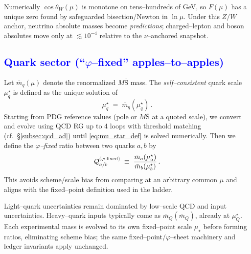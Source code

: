 \documentclass[%
 amsmath,amssymb,
 aps,
prb,
floatfix, showkeys
]{revtex4-2}
\newcommand{\modif}[1]{\textcolor{blue}{#1}}
\begin{document}
Numerically $\cos\theta_W(\mu)$ is monotone on tens–hundreds of GeV, so $F(\mu)$ has a unique zero found by safeguarded bisection/Newton in $\ln\mu$. Under this $Z/W$ anchor, neutrino absolute masses become \emph{predictions}; charged--lepton and boson absolutes move only at $\lesssim10^{-4}$ relative to the $\nu$--anchored snapshot.
















{\modif{
    \subsection{Quark sector (``$\varphi$--fixed'' apples--to--apples)}
}}
Let $\bar m_q(\mu)$ denote the renormalized $M\overline{\mathrm{S}}$ mass.
The \emph{self--consistent} quark scale $\mu^\star_q$ is defined as the unique solution of
\begin{equation}
  \mu^\star_q \;=\; \bar m_q(\mu^\star_q)\,.
  \label{eq:mu_star_def}
\end{equation}
Starting from PDG reference values (pole or $M\overline{\mathrm{S}}$ at a quoted scale), we
convert and evolve using QCD RG up to 4 loops with threshold matching (cf.\ \S\ref{subsec:qcd_ad})
until \eqref{eq:mu_star_def} is solved numerically.
Then we define the \emph{$\varphi$--fixed} ratio between two quarks $a,b$ by
\begin{equation}
  \mathcal{Q}_{a/b}^{(\varphi{\rm\;fixed})}
  \;\equiv\; \frac{\bar m_a(\mu^\star_a)}{\bar m_b(\mu^\star_b)}\,.
  \label{eq:phi_fixed_ratio}
\end{equation}
This avoids scheme/scale bias from comparing at an arbitrary common $\mu$ and
aligns with the fixed--point definition used in the ladder.

 Light--quark uncertainties remain dominated by low--scale QCD and input uncertainties.
 Heavy--quark inputs typically come as $\bar m_Q(\bar m_Q)$, already at $\mu^\star_Q$.
Each experimental mass is evolved to its own fixed--point scale $\mu_\star$ before forming ratios, eliminating scheme bias; the same fixed–point/$\varphi$–sheet machinery and ledger invariants apply unchanged.
\end{document}

